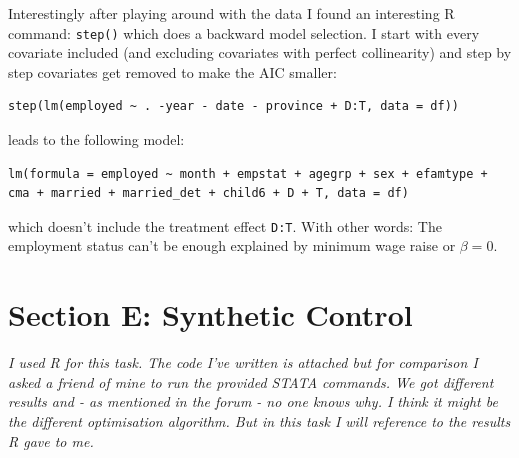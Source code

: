 \documentclass{article}
\begin{document}
\begin{enumerate}[label=(\alph*)]
		Interestingly after playing around with the data I found an interesting R command: \texttt{step()} which does a backward model selection. I start with every covariate included (and excluding covariates with perfect collinearity) and step by step covariates get removed to make the AIC smaller:
		\begin{lstlisting}
step(lm(employed ~ . -year - date - province + D:T, data = df))
		\end{lstlisting}
		leads to the following model:
		\begin{lstlisting}
lm(formula = employed ~ month + empstat + agegrp + sex + efamtype + cma + married + married_det + child6 + D + T, data = df)
		\end{lstlisting}
		which doesn't include the treatment effect \texttt{D:T}. With other words: The employment status can't be enough explained by minimum wage raise or $\beta = 0$.
	\end{enumerate}

	\section*{Section E: Synthetic Control}
	\textit{I used R for this task. The code I've written is attached but for comparison I asked a friend of mine to run the provided STATA commands. We got different results and - as mentioned in the forum - no one knows why. I think it might be the different optimisation algorithm. But in this task I will reference to the results R gave to me.}
	
\end{document}
